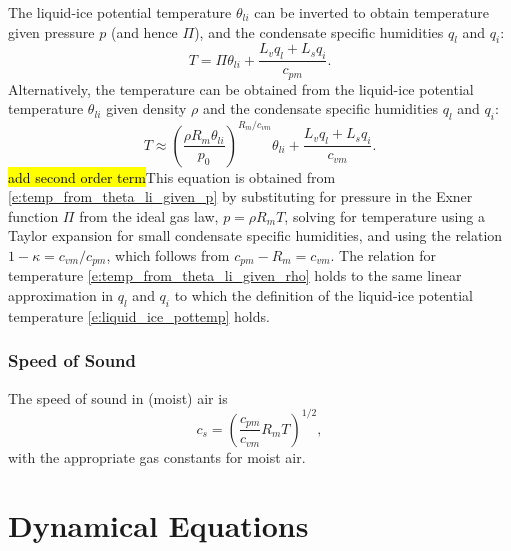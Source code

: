 \documentclass{report}
\begin{document}
The liquid-ice potential temperature $\theta_{li}$ can be inverted to obtain temperature given pressure $p$ (and hence $\Pi$), and the condensate specific humidities $q_l$ and $q_i$:
\begin{equation}\label{e:temp_from_theta_li_given_p}
    T = \Pi \theta_{li} + \frac{L_v q_l + L_s q_i}{c_{pm}}.
\end{equation}
Alternatively, the temperature can be obtained from the liquid-ice potential temperature $\theta_{li}$ given density $\rho$ and the condensate specific humidities $q_l$ and $q_i$: 
\begin{equation}\label{e:temp_from_theta_li_given_rho}
    T \approx \left( \frac{\rho R_m \theta_{li}}{p_0} \right)^{R_m/c_{vm}} \theta_{li} + \frac{L_v q_l + L_s q_i}{c_{vm}}.
\end{equation}
\hl{add second order term}This equation is obtained from \eqref{e:temp_from_theta_li_given_p} by substituting for pressure in the Exner function $\Pi$ from the ideal gas law, $p=\rho R_m T$, solving for temperature using a Taylor expansion for small condensate specific humidities, and using the relation $1-\kappa = c_{vm}/c_{pm}$, which follows from $c_{pm} - R_m = c_{vm}$. The relation for temperature \eqref{e:temp_from_theta_li_given_rho} holds to the same linear approximation in $q_l$ and $q_i$ to which the definition of the liquid-ice potential temperature \eqref{e:liquid_ice_pottemp} holds.   

\subsection{Speed of Sound} The speed of sound in (moist) air is 
\begin{equation}\label{e:soundspeed}
 c_s = \left(\frac{c_{pm}}{c_{vm}} R_m T \right)^{1/2}, 
\end{equation}
with the appropriate gas constants for moist air.

\chapter{Dynamical Equations}
\label{sec:governing_equations}
\end{document}
